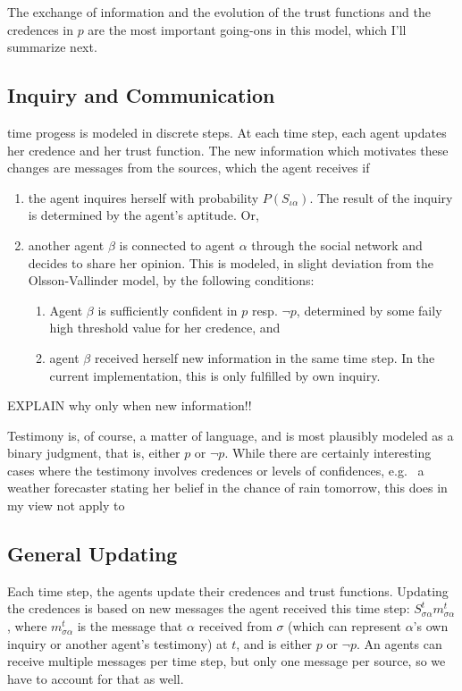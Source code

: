 \documentclass[11pt, a4paper]{article}
\newcommand{\Stsa}{S^t_{\sigma\alpha}}
\newcommand{\sa}{{\sigma\alpha}}
\begin{document}
The exchange of information and the evolution of the trust functions and the credences in $p$ are the most important going-ons in this model, which I'll summarize next.

\subsection{Inquiry and Communication} 

time progess is modeled in discrete steps. At each time step, each agent updates her credence and her trust function. The new information which motivates these changes are messages from the sources, which the agent receives if
\begin{enumerate}[label = (\roman*)]
    \item the agent inquires herself with probability $P(S_{\iota\alpha})$. The result of the inquiry is determined by the agent's aptitude. Or,
    \item another agent $\beta$ is connected to agent $\alpha$ through the social network and decides to share her opinion. This is modeled, in slight deviation from the Olsson-Vallinder model, by the following conditions: 
        \begin{enumerate}[label = (\alph*)]
            \item Agent $\beta$ is sufficiently confident in $p$ resp. $\neg p$, determined by some faily high threshold value for her credence, and
            \item agent $\beta$ received herself new information in the same time step. In the current implementation, this is only fulfilled by own inquiry.  
        \end{enumerate}
\end{enumerate}

EXPLAIN why only when new information!!

Testimony is, of course, a matter of language, and is most plausibly modeled as a binary judgment, that is, either $p$ or $\neg p$. While there are certainly interesting cases where the testimony involves credences or levels of confidences, e.g. \ a weather forecaster stating her belief in the chance of rain tomorrow, this does in my view not apply to  

\subsection{General Updating}

Each time step, the agents update their credences and trust functions. Updating the credences is based on new messages the agent received this time step: $\Stsa m^t_{\sa}$, where $m^t_{\sa}$ is the message that $\alpha$ received from $\sigma$ (which can represent $\alpha$'s own inquiry or another agent's testimony) at $t$, and is either $p$ or $\neg p$. An agents can receive multiple messages per time step, but only one message per source, so we have to account for that as well. 
\end{document}
